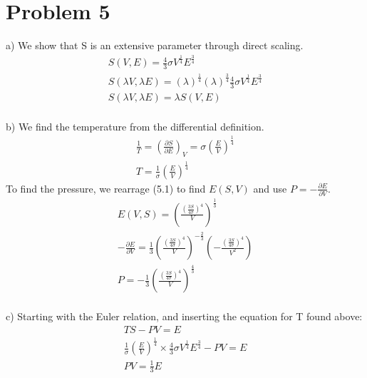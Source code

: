 \documentclass[a4paper,10pt]{article}
\numberwithin{equation}{section}
\begin{document}
\section{Problem 5}
a) We show that S is an extensive parameter through direct scaling.
\begin{gather}
 S(V,E)=\frac{4}{3}\sigma V^{\frac{1}{4}}E^{\frac{3}{4}}\\
 S(\lambda V, \lambda E) = (\lambda)^{\frac{1}{4}}(\lambda)^{\frac{3}{4}}
 \frac{4}{3}\sigma V^{\frac{1}{4}}E^{\frac{3}{4}}\\
  S(\lambda V, \lambda E) = \lambda S(V,E)
\end{gather}
\\ 
b) We find the temperature from the differential definition.
\begin{gather}
 \frac{1}{T}=\left (\frac{\partial S}{\partial E} \right )_V=
    \sigma\left ( \frac{E}{V} \right )^{\frac{1}{4}}\\
 T = \frac{1}{\sigma} \left(\frac{E}{V} \right)^{\frac{1}{4}}
\end{gather}
To find the pressure, we rearrage (5.1) to find $E(S,V)$ and use $P=-\frac{\partial E}{\partial V}$.
\begin{gather}
 E(V,S) = \left(\frac{(\frac{3S}{4\sigma})^4}{V} \right)^{\frac{1}{3}}\\
 -\frac{\partial E}{\partial V}=\frac{1}{3}\left(\frac{(\frac{3S}{4\sigma})^4}{V} \right)^{-\frac{2}{3}}
 \left(-\frac{(\frac{3S}{4\sigma})^4}{V^2} \right)\\
 P=-\frac{1}{3}\left(\frac{(\frac{3S}{4\sigma})^4}{V} \right)^{\frac{4}{3}}
\end{gather}
\\
c) Starting with the Euler relation, and inserting the equation for T found above:
\begin{gather}
 TS-PV=E\\
 \frac{1}{\sigma} \left(\frac{E}{V} \right)^{\frac{1}{4}} \times \frac{4}{3}\sigma V^{\frac{1}{4}}E^{\frac{3}{4}}
 -PV = E\\
 PV = \frac{1}{3}E
\end{gather}
\end{document}
